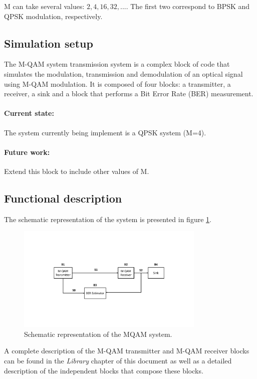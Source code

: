 M can take several values: $2, 4, 16, 32, ...$. The first two correspond to BPSK and QPSK modulation, respectively.


\subsection{Simulation setup}

The M-QAM system transmission system is a complex block of code that simulates the modulation, transmission and
demodulation of an optical signal using M-QAM modulation.
It is composed of four blocks: a transmitter, a receiver, a sink and a block that performs a Bit Error Rate (BER) measurement.

\paragraph{Current state:} The system currently being implement is a QPSK system (M=4).

\paragraph{Future work:} Extend this block to include other values of M.

\subsection{Functional description}

The schematic representation of the
system is presented in figure \ref{MQAM_system_block_diagram}.

\begin{figure}
	\centering
	\includegraphics[width=0.8\textwidth]{./figures/MQAM_system_block_diagram}
	\caption{Schematic representation of the MQAM system.}\label{MQAM_system_block_diagram}
\end{figure}


A complete description of the M-QAM transmitter and M-QAM receiver blocks can be found in the \textit{Library} chapter of this document as well as a detailed description of the independent blocks that compose these blocks.

